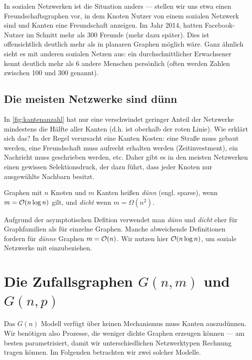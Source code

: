 In  sozialen Netzwerken ist die Situation anders ---
stellen wir uns etwa einen Freundschaftsgraphen vor, in dem Knoten Nutzer von einem sozialen Netzwerk sind und Kanten eine Freundschaft anzeigen.
Im Jahr 2014, hatten Facebook-Nutzer im Schnitt mehr als 300 Freunde (mehr dazu später).
Dies ist offensichtlich deutlich mehr als in planaren Graphen möglich wäre.
Ganz ähnlich sieht es mit anderen sozialen Netzen aus: ein durchschnittlicher Erwachsener kennt deutlich mehr als 6 andere Menschen persönlich (often werden Zahlen zwischen 100 und 300 genannt).

\subsection{Die meisten Netzwerke sind dünn}
In \cref{fig:kantenanzahl} hat nur eine verschwindet geringer Anteil der Netzwerke mindestens die Hälfte aller Kanten (d.h. ist oberhalb der roten Linie).
Wie erklärt sich das?
In der Regel verursacht eine Kanten Kosten:
eine Straße muss gebaut werden, eine Freundschaft muss aufrecht erhalten werden (Zeitinvestment), ein Nachricht muss geschrieben werden, etc.
Daher gibt es in den meisten Netzwerken einen gewissen Selektionsdruck, der dazu führt, dass jeder Knoten nur ausgewählte Nachbarn besitzt.

\begin{definition}
    Graphen  mit $n$ Knoten und $m$ Kanten heißen \emph{dünn} (engl. sparse), wenn $m = \mathcal{O}\!\left(n \log n\right)$ gilt, und \emph{dicht} wenn $m = \Omega(n^2)$.
\end{definition}

\begin{remark}
    Aufgrund der asymptotischen Defition verwendet man \emph{dünn} und \emph{dicht} eher für Graphfamilien als für einzelne Graphen.
    Manche abweichende Definitionen fordern für \emph{dünne} Graphen $m = \mathcal{O}\!\left(n\right)$.
    Wir nutzen hier $\mathcal{O}\!\left(n\log n\right)$, um soziale Netzwerke mit einzubeziehen.
\end{remark}

\section{Die Zufallsgraphen $G(n, m)$ und $G(n, p)$}
Das $G(n)$ Modell verfügt über keinen Mechanismus muss Kanten auszudünnen.
Wir benötigen also Prozesse, die weniger dichte Graphen erzeugen können ---
am besten parametrisiert, damit wir unterschiedlichen Netzwerktypen Rechnung tragen können.
Im Folgenden betrachten wir zwei solcher Modelle.

